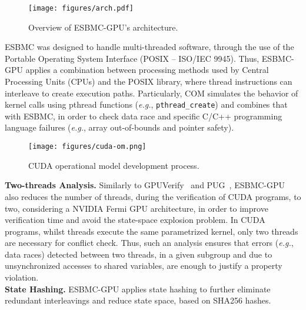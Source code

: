 \documentclass{llncs}
\begin{document}
\begin{figure}[htb]
  \centering
  \texttt{[image: figures/arch.pdf]}
  \caption{Overview of ESBMC-GPU's architecture.}
  \label{figure:arch}
\end{figure}



ESBMC was designed to handle multi-threaded software, through the use of the Portable Operating System Interface (POSIX -- ISO/IEC 9945).
Thus, ESBMC-GPU applies a combination between processing methods used by Central Processing Units (CPUs) and the POSIX library, where thread instructions can interleave to create execution paths. Particularly, COM simulates the behavior of kernel calls using pthread functions ({\it e.g.}, {\tt pthread\_create}) and combines that with ESBMC, in order to check data race and specific C/C++ programming language failures ({\it e.g.}, array out-of-bounds and pointer safety).\\

\begin{figure}[htb]
  \centering
  \texttt{[image: figures/cuda-om.png]}
  \caption{CUDA operational model development process.}
  \label{figure:om}
\end{figure}


\noindent \textbf{Two-threads Analysis.} Similarly to GPUVerify~\cite{betts:2012} and PUG~\cite{Li:2010}, ESBMC-GPU also reduces the number of threads, during the verification of CUDA programs, to two, considering a NVIDIA Fermi GPU architecture, in order to improve verification time and avoid the state-space explosion problem. In CUDA programs, whilst threads execute the same parametrized kernel, only two threads are necessary for conflict check. Thus, such an analysis ensures that errors ({\it e.g.}, data races) detected between two threads, in a given subgroup and due to unsynchronized accesses to shared variables, are enough to justify a property violation.\\

\noindent \textbf{State Hashing.} ESBMC-GPU applies state hashing to further eliminate redundant interleavings and reduce state space, based on SHA256 hashes.\\%
\end{document}
